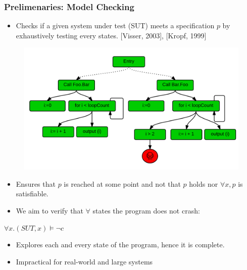 \documentclass{beamer}
\begin{document}

\begin{frame}
\frametitle{Prelimenaries: Model Checking}

\begin{itemize}

\item Checks if a given system under test (SUT) meets a specification $p$ by exhaustively testing every states. [Visser, 2003], [Kropf, 1999]
\end{itemize}
\begin{figure}
\includegraphics[width=0.4\linewidth]{media/mc.png}
\end{figure}

\begin{itemize}
\item Ensures that $p$ is reached at some point and not that $p$ holds nor $\forall x, p$ is satisfiable.
\item We aim to verify that $\forall$ states the program does not crash:

\end{itemize}

\begin{center}
$\forall x.(SUT, x) \models \neg c$
\end{center}

\begin{itemize}
\item Explores each and every state of the program, hence it is complete.
\item Impractical for real-world and large systems
\end{itemize}

\end{frame}

\end{document}
